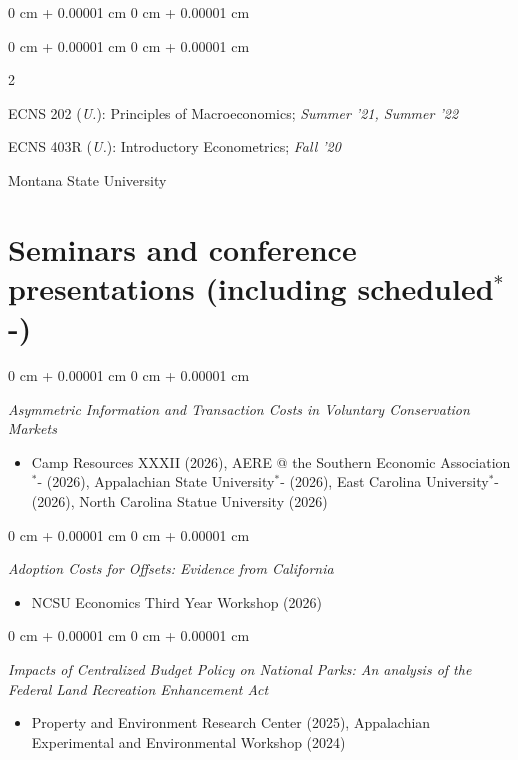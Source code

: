\documentclass[12pt]{article}
\newenvironment{highlights}{
	\begin{itemize}[
		topsep=0.10 cm,
		parsep=0.10 cm,
		partopsep=0pt,
		itemsep=0pt,
		leftmargin=0.3 cm + 10pt,
		label={}
		]
	}{
	\end{itemize}
} %
\newenvironment{onecolentry}{
	\begin{adjustwidth}{
			0 cm + 0.00001 cm
		}{
			0 cm + 0.00001 cm
		}
	}
	{
	\end{adjustwidth}
} %
\newenvironment{paper}{
	\begin{onecolentry}
	\begin{hangingpar}
}{
	\end{hangingpar}
	\end{onecolentry}
	\smallskip
} %
\newenvironment{twocolentry}[2][]{
	\onecolentry
	\def\secondColumn{#2}
	\setcolumnwidth{\fill, 4.5 cm}
	\begin{paracol}{2}
	}{
		\switchcolumn \raggedleft \secondColumn
	\end{paracol}
	\endonecolentry
} %
\newcommand{\Star}[1]{#1\ensuremath{^*}\kern-\scriptspace}
\begin{document}
\begin{paper}
\begin{twocolentry}{Montana State University}
	\begin{hangingpar}
		ECNS 202 (\textit{U.}): Principles of Macroeconomics; \textit{Summer '21, Summer '22}
	\end{hangingpar}
	\begin{hangingpar}
		ECNS 403R (\textit{U.}): Introductory Econometrics; \textit{Fall '20}
	\end{hangingpar}
\end{twocolentry}

\section{Seminars and conference presentations (including \Star{scheduled})}

\begin{onecolentry}
	\emph{Asymmetric Information and Transaction Costs in Voluntary Conservation Markets}
	\begin{highlights}
		\item \small Camp Resources XXXII (2026), \Star{AERE @ the Southern Economic Association} (2026), \Star{Appalachian State University} (2026), \Star{East Carolina University} (2026), North Carolina Statue University (2026)
	\end{highlights}
\end{onecolentry}

\vspace{0.1cm}

\begin{onecolentry}
	\emph{Adoption Costs for Offsets: Evidence from California}
	\begin{highlights}
		\item \small NCSU Economics Third Year Workshop (2026)
	\end{highlights}
\end{onecolentry}

\vspace{0.1cm}

\begin{onecolentry}
	\emph{Impacts of Centralized Budget Policy on National Parks: An analysis of the Federal Land Recreation Enhancement Act}
	\begin{highlights}
		\item \small Property and Environment Research Center (2025), Appalachian Experimental and Environmental Workshop (2024)
	\end{highlights}
\end{onecolentry}


\end{paper}
\end{document}
